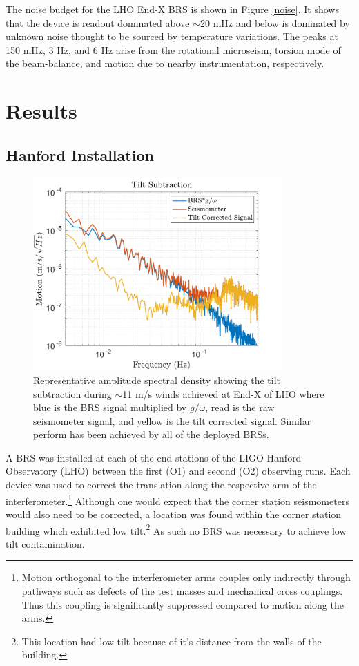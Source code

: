 \documentclass [12pt, proquest]{uwthesis}[2019]
\begin{document}
 The noise budget for the LHO End-X BRS is shown in Figure \ref{noise}. It shows that the device is readout dominated above $\sim$20 mHz and below is dominated by unknown noise thought to be sourced by temperature variations. The peaks at 150 mHz, 3 Hz, and 6 Hz arise from the rotational microseism, torsion mode of the beam-balance, and motion due to nearby instrumentation, respectively.

\section{Results}\label{results}
\subsection{Hanford Installation} \label{BRS_Hanford}

\begin{figure}[!h]
\begin{center}
\includegraphics[width=0.85\textwidth]{TiltCorrSpec.pdf}
\caption[Representative amplitude spectral density showing the tilt subtraction during windy conditions]{Representative amplitude spectral density showing the tilt subtraction during $\sim$11 m/s winds achieved at End-X of LHO where blue is the BRS signal multiplied by $g/\omega$, read is the raw seismometer signal, and yellow is the tilt corrected signal. Similar perform has been achieved by all of the deployed BRSs.}
\label{sub}
\end{center}
\end{figure}

\quad A BRS was installed at each of the end stations of the LIGO Hanford Observatory (LHO) between the first (O1) and second (O2) observing runs. Each device was used to correct the translation along the respective arm of the interferometer.\footnote{Motion orthogonal to the interferometer arms couples only indirectly through pathways such as defects of the test masses and mechanical cross couplings. Thus this coupling is significantly suppressed compared to motion along the arms.} Although one would expect that the corner station seismometers would also need to be corrected, a location was found within the corner station building which exhibited low tilt.\footnote{This location had low tilt because of it's distance from the walls of the building.} As such no BRS was necessary to achieve low tilt contamination.
\end{document}
